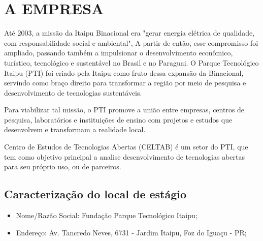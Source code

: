 \chapter{A EMPRESA}
\vspace*{-2cm}

Até 2003, a missão da Itaipu Binacional era "gerar energia elétrica de qualidade, com responsabilidade social e ambiental", A partir de então, esse compromisso foi ampliado, passando também a impulsionar o desenvolvimento econômico, turístico, tecnológico e sustentável no Brasil e no Paraguai. O Parque Tecnológico Itaipu (PTI) foi criado pela Itaipu como fruto dessa expansão da Binacional, servindo como braço direito para transformar a região por meio de pesquisa e desenvolvimento de tecnologias sustentáveis.

Para viabilizar tal missão, o PTI promove a união entre empresas, centros de pesquisa, laboratórios e instituições de ensino com projetos e estudos que desenvolvem e transformam a realidade local.

Centro de Estudos de Tecnologias Abertas (CELTAB) é um setor do PTI, que tem como objetivo principal a analise desenvolvimento de tecnologias abertas para seu próprio uso, ou de parceiros.

\section{Caracterização do local de estágio}
\begin{itemize}
	
\item Nome/Razão Social: Fundação Parque Tecnológico Itaipu;
\item Endereço: Av. Tancredo Neves, 6731 - Jardim Itaipu, Foz do Iguaçu - PR;

\end{itemize}